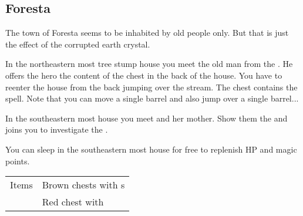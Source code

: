 \subsection{Foresta}
\label{map:foresta}

The town of Foresta seems to be inhabited by old people only. But that is just the effect of the corrupted earth crystal.

In the northeastern most tree stump house you meet the old man from the . He offers the hero the content of the chest in the back of the house. You have to reenter the house from the back jumping over the stream. The chest contains the  spell. Note that you can move a single barrel and also jump over a single barrel...

In the southeastern most house you meet  and her mother. Show them the  and  joins you to investigate the .

You can sleep in the southeastern most house for free to replenish HP and magic points.

\begin{longtable}{ l p{9cm} }
	Items
	& Brown chests with \nameref{item:cure_potion}s \\
	& Red chest with \nameref{spell:cure}
\end{longtable}
